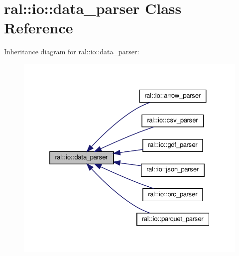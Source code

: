 \hypertarget{classral_1_1io_1_1data__parser}{}\section{ral\+:\+:io\+:\+:data\+\_\+parser Class Reference}
\label{classral_1_1io_1_1data__parser}


Inheritance diagram for ral\+:\+:io\+:\+:data\+\_\+parser\+:\nopagebreak
\begin{figure}[H]
\begin{center}
\leavevmode
\includegraphics[width=325pt]{classral_1_1io_1_1data__parser__inherit__graph}
\end{center}
\end{figure}
